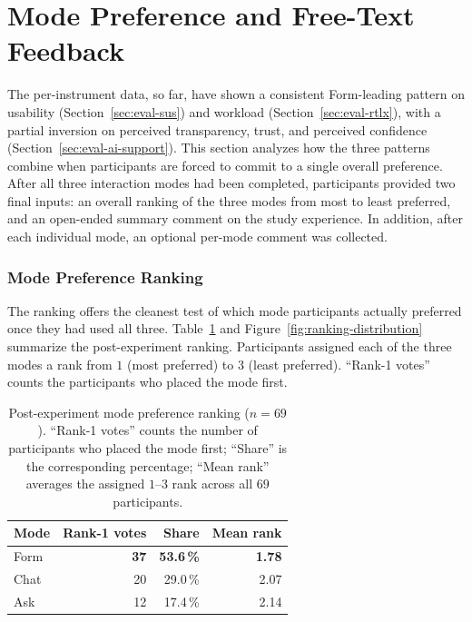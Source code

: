 \section{Mode Preference and Free-Text Feedback}
\label{sec:eval-freeform}

The per-instrument data, so far, have shown a consistent Form-leading
pattern on usability (Section~\ref{sec:eval-sus}) and workload
(Section~\ref{sec:eval-rtlx}), with a partial inversion on perceived
transparency, trust, and perceived confidence
(Section~\ref{sec:eval-ai-support}). This section analyzes how the three
patterns combine when participants are forced to commit to a single
overall preference. After all three interaction modes had been
completed, participants provided two final inputs: an overall
ranking of the three modes from most to least preferred, and an
open-ended summary comment on the study experience. In addition,
after each individual mode, an optional per-mode comment was
collected.

\subsubsection{Mode Preference Ranking}

The ranking offers the cleanest test of which mode participants
actually preferred once they had used all three.
Table~\ref{tab:mode-preference} and Figure~\ref{fig:ranking-distribution} summarize
the post-experiment ranking.
Participants assigned each of the three modes a rank from
$1$ (most preferred) to $3$ (least preferred). ``Rank-1 votes''
counts the participants who placed the mode first.

\begin{table}[htbp]
\centering
\caption{Post-experiment mode preference ranking ($n = 69$).
``Rank-1 votes'' counts the number of participants who placed the
mode first; ``Share'' is the corresponding percentage; ``Mean rank''
averages the assigned $1$--$3$ rank across all $69$ participants.}
\label{tab:mode-preference}
\begin{tabular}{@{}l r r r@{}}
\toprule
Mode & Rank-1 votes & Share & Mean rank \\
\midrule
Form & \textbf{37} & \textbf{53.6\,\%} & \textbf{1.78} \\
Chat & 20 & 29.0\,\% & 2.07 \\
Ask  & 12 & 17.4\,\% & 2.14 \\
\bottomrule
\end{tabular}
\end{table}

